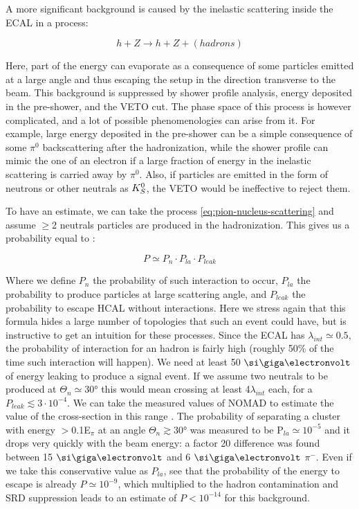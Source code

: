 A more significant background is caused by the inelastic scattering inside the ECAL in a process:

\begin{equation}
  \label{eq:pion-nucleus-scattering}
  h + Z \longrightarrow h + Z + (hadrons)
\end{equation}

Here, part of the energy can evaporate as a consequence of some particles emitted at a large angle and thus escaping the setup in the direction transverse to the beam. This background is suppressed by shower profile analysis, energy deposited in the pre-shower, and the VETO cut. The phase space of this process is however complicated, and a lot of possible phenomenologies can arise from it. For example, large energy deposited in the pre-shower can be a simple consequence of some $\pi^0$ backscattering after the hadronization, while the shower profile can mimic the one of an electron if a large fraction of energy in the inelastic scattering is carried away by $\pi^0$. Also, if particles are emitted in the form of neutrons or other neutrals as $K^0_S$, the VETO would be ineffective to reject them.

To have an estimate, we can take the process \ref{eq:pion-nucleus-scattering} and assume $\geq$2 neutrals particles are produced in the hadronization. This gives us a probability equal to \cite{gkkk1}:

\begin{equation}
  \label{eq:transverse-leak-estimate}
  P \simeq P_n \cdot P_{la} \cdot P_{leak}
\end{equation}

Where we define $P_n$ the probability of such interaction to occur, $P_{la}$ the probability to produce particles at large scattering angle, and $P_{leak}$ the probability to escape HCAL without interactions. Here we stress again that this formula hides a large number of topologies that such an event could have, but is instructive to get an intuition for these processes. Since the ECAL has $\lambda_{int} \simeq 0.5$, the probability of interaction for an hadron is fairly high (roughly 50\% of the time such interaction will happen). We need at least 50 $\gev$ of energy leaking to produce a signal event. If we assume two neutrals to be produced at $\Theta_{n} \simeq 30$\si{\degree} this would mean crossing at least 4$\lambda_{int}$ each, for a $P_{leak} \lesssim 3 \cdot 10^{-4}$. We can take the measured values of NOMAD to estimate the value of the cross-section in this range \cite{AUTIERO1998285,GNINENKO1998583}. The probability of separating a cluster with energy $>$0.1E$_{\pi}$ at an angle $\Theta_{n} \gtrsim 30$\si{\degree} was measured to be P$_{la} \simeq 10^{-5}$ and it drops very quickly with the beam energy: a factor 20 difference was found between 15 $\gev$ and 6 $\gev$ $\pi^-$. Even if we take this conservative value as $P_{la}$, see that the probability of the energy to escape is already $P\simeq 10^{-9}$, which multiplied to the hadron contamination and SRD suppression leads to an estimate of $P<10^{-14}$ for this background.

